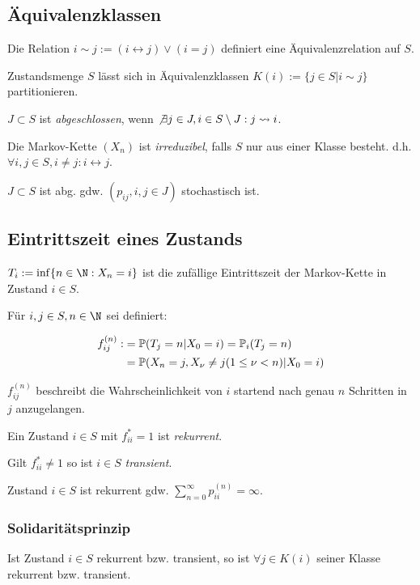 \subsection*{Äquivalenzklassen}

Die Relation $i \sim j := (i \leftrightarrow j) \lor (i = j)$ definiert eine Äquivalenzrelation auf $S$.

Zustandsmenge $S$ lässt sich in Äquivalenzklassen $K(i) := \{j \in S | i \sim j\}$ partitionieren.

\vspace*{2mm}

$J \subset S$ ist \emph{abgeschlossen}, wenn $\not\exists j \in J, i \in S \setminus J : j \rightsquigarrow i$.

Die Markov-Kette $(X_n)$ ist \emph{irreduzibel}, falls $S$ nur aus einer Klasse besteht. d.h. $\forall i, j \in S, i \neq j : i \leftrightarrow j$.

\vspace*{2mm}

$J \subset S$ ist abg. gdw. $(p_{ij}, i,j \in J)$ stochastisch ist.

\subsection*{Eintrittszeit eines Zustands}

$T_i := \inf\{ n \in \N : X_n = i \}$ ist die zufällige Eintrittszeit der Markov-Kette in Zustand $i \in S$.

Für $i, j \in S, n \in \N$ sei definiert:

\vspace*{-4mm}
\begin{align*}
f_{ij}^{(n)} :&= \P(T_j = n | X_0 = i) = \P_i(T_j = n) \\
&= \P(X_n = j, X_\nu \neq j (1 \leq \nu < n) | X_0 = i)
\end{align*}

$f_{ij}^{(n)}$ beschreibt die Wahrscheinlichkeit von $i$ startend nach genau $n$ Schritten in $j$ anzugelangen.

\vspace*{2mm}

Ein Zustand $i \in S$ mit $f_{ii}^* = 1$ ist \emph{rekurrent}.

Gilt $f_{ii}^* \neq 1$ so ist $i \in S$ \emph{transient}.

Zustand $i \in S$ ist rekurrent gdw. $\displaystyle\sum_{n = 0}^\infty p_{ii}^{(n)} = \infty$.

\subsubsection*{Solidaritätsprinzip}

Ist Zustand $i \in S$ rekurrent bzw. transient, so ist $\forall j \in K(i)$ seiner Klasse rekurrent bzw. transient.
